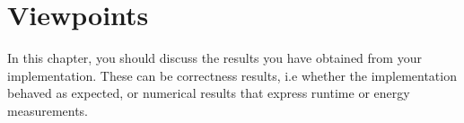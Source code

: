 \chapter{Viewpoints}
In this chapter, you should discuss the results you have obtained from your implementation.
These can be correctness results, i.e whether the implementation behaved as expected, or numerical results that express runtime or energy measurements.